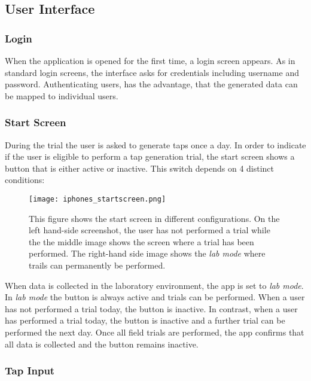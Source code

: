 \subsection{User Interface}
\subsubsection{Login}
When the application is opened for the first time, a login screen appears. As in standard login screens, the interface asks for credentials including username and password. Authenticating users, has the advantage, that the generated data can be mapped to individual users.


\subsubsection{Start Screen}
During the trial the user is asked to generate taps once a day. In order to indicate if the user is eligible to perform a tap generation trial, the start screen shows a button that is either active or inactive. This switch depends on 4 distinct conditions: \\

\begin{figure}[h!]
  \centering
  \texttt{[image: iphones\_startscreen.png]}
  \caption{This figure shows the start screen in different configurations. On the left hand-side screenshot, the user has not performed a trial while the the middle image shows the screen where a trial has been performed. The right-hand side image shows the \textit{lab mode} where trails can permanently be performed.}
\end{figure}

When data is collected in the laboratory environment, the app is set to \textit{lab mode}. In \textit{lab mode} the button is always active and trials can be performed. When a user has not performed a trial today, the button is inactive. In contrast, when a user has performed a trial today, the button is inactive and a further trial can be performed the next day. Once all field trials are performed, the app confirms that all data is collected and the button remains inactive.

\subsubsection{Tap Input}

